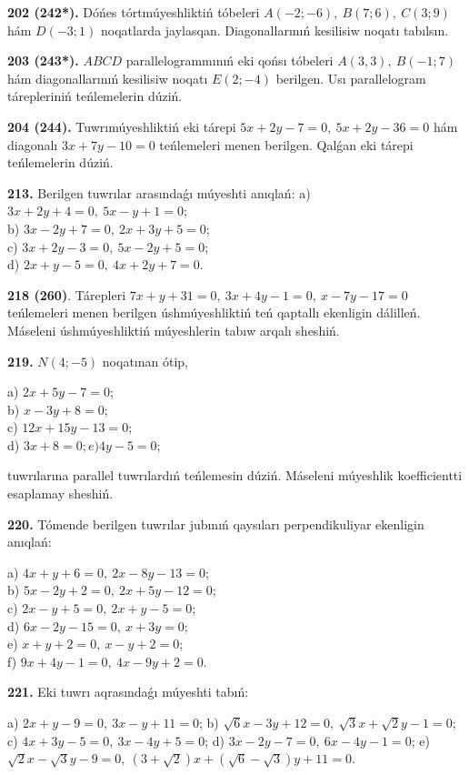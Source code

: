 \documentclass{article}
\begin{document}
\textbf{202 (242*).} Dóńes tórtmúyeshliktiń tóbeleri
\(A(-2;-6),\ B(7;6),\ C(3;9)\) hám \(D(-3;1)\) noqatlarda
jaylasqan. Diagonallarınıń kesilisiw noqatı tabılsın.

\textbf{203 (243*).} $ABCD$ parallelogrammınıń eki qońsı tóbeleri
\(A(3,3),\ B(-1;7)\) hám diagonallarınıń kesilisiw noqatı
\(E(2;-4)\) berilgen. Usı parallelogram tárepleriniń teńlemelerin
dúziń.

\textbf{204 (244).} Tuwrımúyeshliktiń eki tárepi
\(5x+2y-7=0,\ 5x+2y-36=0\) hám diagonalı
\(3x+7y-10=0\) teńlemeleri menen berilgen. Qalǵan eki tárepi
teńlemelerin dúziń.

\textbf{213.} Berilgen tuwrılar arasındaǵı múyeshti anıqlań:
a) $3x+2y+4=0,\ 5x-y+1=0$; \\
b) $3x-2y+7=0,\ 2x+3y+5=0$; \\
c) $3x+2y-3=0,\ 5x-2y+5=0$; \\
d) $2x+y-5=0,\ 4x+2y+7=0$.

\textbf{218 (260)}. Tárepleri
\(7x+y+31=0,\ 3x+4y-1=0,\ x-7y-17=0\) teńlemeleri
menen berilgen úshmúyeshliktiń teń qaptallı ekenligin dálilleń. 
Máseleni úshmúyeshliktiń
múyeshlerin tabıw arqalı sheshiń.

\textbf{219.} \(N(4;-5)\) noqatınan ótip,

a) $2x+5y-7=0$; \\
b) $x-3y+8=0$; \\
c) $12x+15y-13=0$; \\
d) $3x+8=0;e)4y-5=0$;

tuwrılarına parallel tuwrılardıń teńlemesin dúziń. Máseleni múyeshlik
koefficientti esaplamay sheshiń.

\textbf{220.} Tómende berilgen tuwrılar jubınıń qaysıları
perpendikuliyar ekenligin anıqlań:

a) $4x+y+6=0,\ 2x-8y-13=0$; \\
b) $5x-2y+2=0,\ 2x+5y-12=0$; \\
c) $2x-y+5=0,\ 2x+y-5=0$; \\
d) $6x-2y-15=0,\ x+3y=0$; \\
e) $x+y+2=0,\ x-y+2=0$; \\
f) $9x+4y-1=0,\ 4x-9y+2=0$.

\textbf{221.} Eki tuwrı aqrasındaǵı múyeshti tabıń:

a) $2x+y-9=0,\ 3x-y+11=0$;
b) $\sqrt{6}x-3y+12=0,\ \sqrt{3}x+\sqrt{2}y-1=0$;
c) $4x+3y-5=0,\ 3x-4y+5=0$;
d) $3x-2y-7=0,\ 6x-4y-1=0$;
e) $\sqrt{2}x-\sqrt{3}y-9=0,\ \left( 3+\sqrt{2} \right)x+\left( \sqrt{6}-\sqrt{3} \right)y+11=0$.
\end{document}
